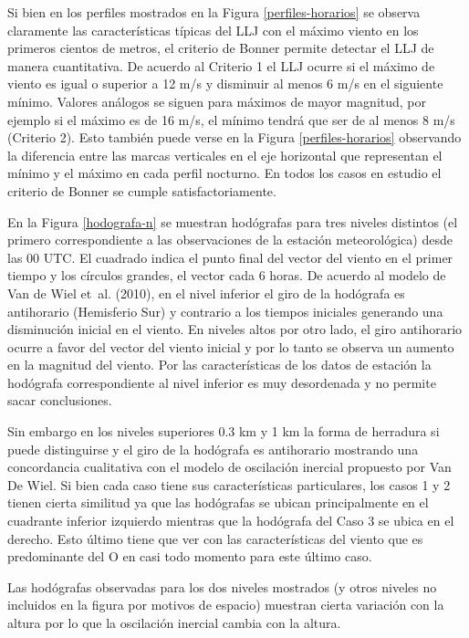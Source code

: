 \documentclass[12pt,spanish,oneside]{book}
\begin{document}
Si bien en los perfiles mostrados en la Figura \ref{perfiles-horarios}
se observa claramente las características típicas del LLJ con el máximo
viento en los primeros cientos de metros, el criterio de Bonner permite
detectar el LLJ de manera cuantitativa. De acuerdo al Criterio 1 el LLJ
ocurre si el máximo de viento es igual o superior a 12 m/s y disminuir
al menos 6 m/s en el siguiente mínimo. Valores análogos se siguen para
máximos de mayor magnitud, por ejemplo si el máximo es de 16 m/s, el
mínimo tendrá que ser de al menos 8 m/s (Criterio 2). Esto también puede
verse en la Figura \ref{perfiles-horarios} observando la diferencia
entre las marcas verticales en el eje horizontal que representan el
mínimo y el máximo en cada perfil nocturno. En todos los casos en
estudio el criterio de Bonner se cumple satisfactoriamente.

En la Figura \ref{hodografa-n} se muestran hodógrafas para tres niveles
distintos (el primero correspondiente a las observaciones de la estación
meteorológica) desde las 00 UTC. El cuadrado indica el punto final del
vector del viento en el primer tiempo y los círculos grandes, el vector
cada 6 horas. De acuerdo al modelo de Van de Wiel et~al. (2010), en el
nivel inferior el giro de la hodógrafa es antihorario (Hemisferio Sur) y
contrario a los tiempos iniciales generando una disminución inicial en
el viento. En niveles altos por otro lado, el giro antihorario ocurre a
favor del vector del viento inicial y por lo tanto se observa un aumento
en la magnitud del viento. Por las características de los datos de
estación la hodógrafa correspondiente al nivel inferior es muy
desordenada y no permite sacar conclusiones.

Sin embargo en los niveles superiores 0.3 km y 1 km la forma de
herradura si puede distinguirse y el giro de la hodógrafa es antihorario
mostrando una concordancia cualitativa con el modelo de oscilación
inercial propuesto por Van De Wiel. Si bien cada caso tiene sus
características particulares, los casos 1 y 2 tienen cierta similitud ya
que las hodógrafas se ubican principalmente en el cuadrante inferior
izquierdo mientras que la hodógrafa del Caso 3 se ubica en el derecho.
Esto último tiene que ver con las características del viento que es
predominante del O en casi todo momento para este último caso.

Las hodógrafas observadas para los dos niveles mostrados (y otros
niveles no incluidos en la figura por motivos de espacio) muestran
cierta variación con la altura por lo que la oscilación inercial cambia
con la altura.
\end{document}
